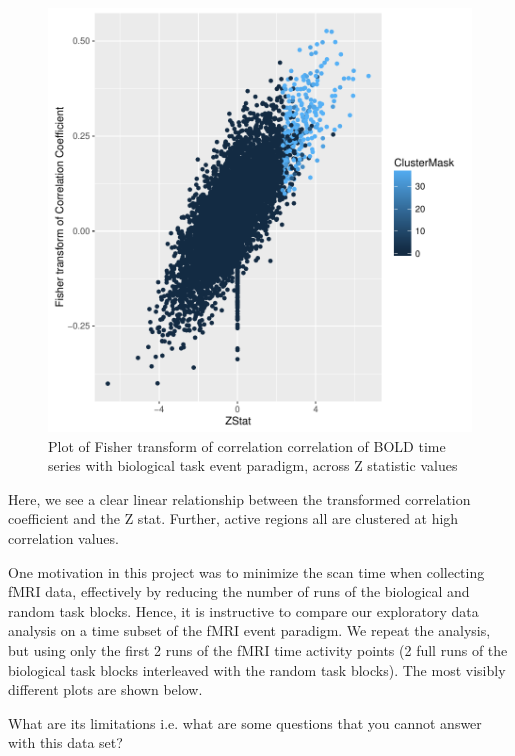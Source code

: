 \documentclass{report}
\begin{document}
\begin{figure}

\label{fig:figure6}
\caption{Plot of Fisher transform of correlation correlation of BOLD time series with biological task event paradigm, across Z statistic values}
\includegraphics{Milestone-009}
\end{figure}

Here, we see a clear linear relationship between the transformed correlation coefficient and the Z stat. Further, active regions all are clustered at high correlation values.

One motivation in this project was to minimize the scan time when collecting fMRI data, effectively by reducing the number of runs of the biological and random task blocks. Hence, it is instructive to compare our exploratory data analysis on a time subset of the fMRI event paradigm. We repeat the analysis, but using only the first 2 runs of the fMRI time activity points (2 full runs of the biological task blocks interleaved with the random task blocks). The most visibly different plots are shown below.

What are its limitations i.e. what are some questions that you cannot answer with this data set?
\end{document}
